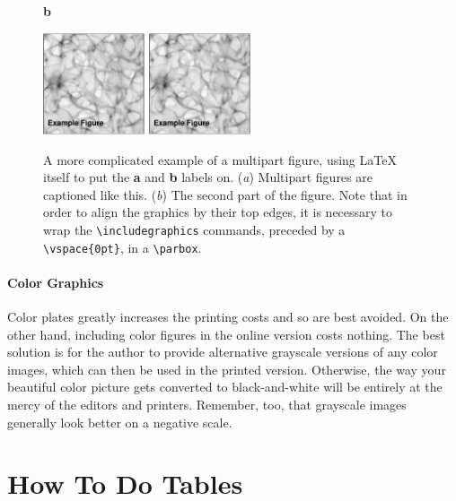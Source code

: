 \documentclass[preprint]{rmxac}
\newcommand{\CS}[1]{\texttt{\textbackslash #1}}
\begin{document}
\begin{figure}[!t]
  \hspace*{\columnwidth}\hspace*{\columnsep}%
  \textbf{b}\\[-0.7\baselineskip]
  \parbox[t]{\textwidth}{%
     \vspace{0pt}
     \includegraphics[width=\columnwidth,height=3cm]{example-fig}%
     \hfill%
     \includegraphics[width=\columnwidth,height=3cm]{example-fig}
     }
  \caption{A more complicated example of a multipart
    figure, using \LaTeX{} itself to put the \textbf{a} and \textbf{b}
    labels on. (\textit{a}) Multipart figures are captioned like this.
    (\textit{b}) The second part of the figure.  Note that in order to
    align the graphics by their top edges, it is necessary to wrap the
    \CS{includegraphics} commands, preceded by a \CS{vspace\{0pt\}},
    in a \CS{parbox}.  }
  \label{fig:widefig2}
\end{figure}


\paragraph{Color Graphics}

Color plates greatly increases the printing costs and so are best
avoided. On the other hand, including color figures in the online
version costs nothing. The best solution is for the author to provide
alternative grayscale versions of any color images, which can then be
used in the printed version. Otherwise, the way your beautiful color
picture gets converted to black-and-white will be entirely at the
mercy of the editors and printers. Remember, too, that grayscale
images generally look better on a negative scale.

\section{How To Do Tables}
\label{sec:how-do-tables}
\end{document}
